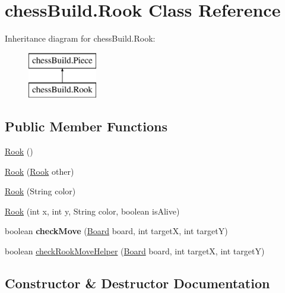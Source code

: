 \hypertarget{classchess_build_1_1_rook}{}\section{chess\+Build.\+Rook Class Reference}
\label{classchess_build_1_1_rook}
Inheritance diagram for chess\+Build.\+Rook\+:\begin{figure}[H]
\begin{center}
\leavevmode
\includegraphics[height=2.000000cm]{classchess_build_1_1_rook}
\end{center}
\end{figure}
\subsection*{Public Member Functions}
\begin{DoxyCompactItemize}
\item 
\hyperlink{classchess_build_1_1_rook_a9967db4000d7beac455338a45ffd43bc}{Rook} ()
\item 
\hyperlink{classchess_build_1_1_rook_a79c81af4e999db11ceb66e8049d33b16}{Rook} (\hyperlink{classchess_build_1_1_rook}{Rook} other)
\item 
\hyperlink{classchess_build_1_1_rook_aff5411564cfd90a16a74290124bbdae3}{Rook} (String color)
\item 
\hyperlink{classchess_build_1_1_rook_a1b2faa9ca40b7fed9172ffe0b15237d9}{Rook} (int x, int y, String color, boolean is\+Alive)
\item 
\mbox{\label{classchess_build_1_1_rook_af745f7c175e2ef88983a20db46d22583}} 
boolean {\bfseries check\+Move} (\hyperlink{classchess_build_1_1_board}{Board} board, int targetX, int targetY)
\item 
boolean \hyperlink{classchess_build_1_1_rook_a9d7f5bc7080721398cfd7f0ae3166494}{check\+Rook\+Move\+Helper} (\hyperlink{classchess_build_1_1_board}{Board} board, int targetX, int targetY)
\end{DoxyCompactItemize}


\subsection{Constructor \& Destructor Documentation}
\mbox{\label{classchess_build_1_1_rook_a9967db4000d7beac455338a45ffd43bc}} 
